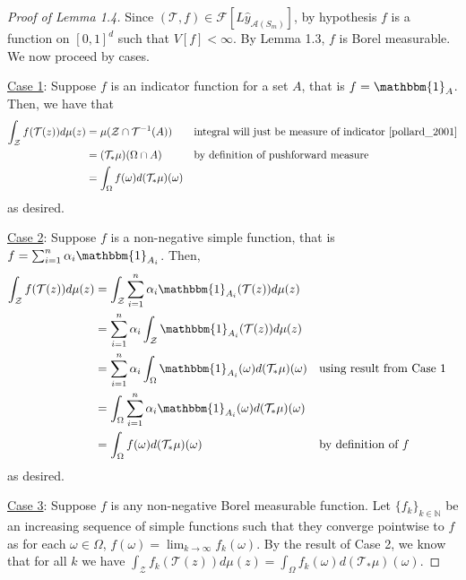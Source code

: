 \documentclass{article}
\begin{document}
\begin{proof}[Proof of Lemma 1.4]
    Since $(\mathcal{T}, f) \in \mathcal{F}[L \hat{y}_{\mathcal{A}(S_m)}]$, by hypothesis $f$ is a function on $[0, 1]^d$ such that $V[f] < \infty$. By Lemma 1.3, $f$ is Borel measurable. We now proceed by cases.

    \underline{Case 1}: Suppose $f$ is an indicator function for a set $A$, that is $f = \mathbbm{1}_{A}$. Then, we have that
    \begin{align*}
        \int_{\mathcal{Z}} f(\mathcal{T}(z)) d\mu(z) & = \mu(\mathcal{Z} \cap \mathcal{T}^{-1}(A)) && \text{integral will just be measure of indicator \cite{pollard_2001}} \\
        & = (\mathcal{T}_{*} \mu)(\Omega \cap A) && \text{by definition of pushforward measure} \\
        & = \int_{\Omega} f(\omega) d(\mathcal{T}_{*} \mu) (\omega)
    \end{align*}
    as desired.

    \underline{Case 2}: Suppose $f$ is a non-negative simple function, that is $f = \sum_{i=1}^{n} \alpha_i \mathbbm{1}_{A_i}$. Then,
    \begin{align*}
        \int_{\mathcal{Z}} f(\mathcal{T}(z)) d\mu(z) & = \int_{\mathcal{Z}} \sum_{i=1}^{n} \alpha_i \mathbbm{1}_{A_i} (\mathcal{T}(z)) d\mu(z) \\
        & = \sum_{i=1}^{n} \alpha_i \int_{\mathcal{Z}} \mathbbm{1}_{A_i} (\mathcal{T}(z)) d\mu(z) \\
        & = \sum_{i=1}^{n} \alpha_i \int_{\Omega} \mathbbm{1}_{A_i} (\omega) d(\mathcal{T}_{*}\mu)(\omega) && \text{using result from Case 1} \\
        & = \int_{\Omega} \sum_{i=1}^{n} \alpha_i \mathbbm{1}_{A_i} (\omega) d(\mathcal{T}_{*}\mu)(\omega) \\
        & = \int_{\Omega} f(\omega) d(\mathcal{T}_{*}\mu)(\omega) && \text{by definition of } f
    \end{align*}
    as desired.

    \underline{Case 3}: Suppose $f$ is any non-negative Borel measurable function. Let $\{f_k\}_{k \in \mathbb{N}}$ be an increasing sequence of simple functions such that they converge pointwise to $f$ as for each $\omega \in \Omega$, $f(\omega) = \lim_{k \rightarrow \infty} f_k (\omega)$. By the result of Case 2, we know that for all $k$ we have $\int_{\mathcal{Z}} f_k (\mathcal{T}(z)) d\mu(z) = \int_{\Omega} f_k (\omega) d(\mathcal{\mathcal{T}_{*}}\mu) (\omega)$.
    

\end{proof}
\end{document}
